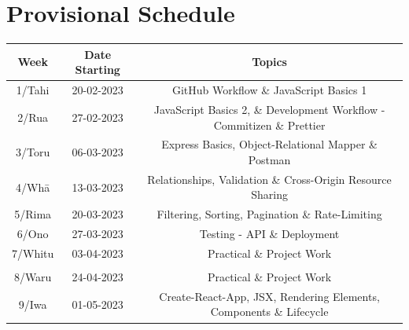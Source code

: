 \documentclass{article}
\begin{document}
\section*{Provisional Schedule}
\renewcommand{\arraystretch}{1.5}
\begin{tabular}{|c|c|c|c|}
	\hline
	\textbf{Week}                  & \textbf{Date Starting}            & \multicolumn{2}{c|}{\textbf{Topics}}                                                                                             \\ \hline
	\footnotesize 1/Tahi           & \footnotesize 20-02-2023 & \multicolumn{2}{c|}{\footnotesize GitHub Workflow \& JavaScript Basics 1}    \\ \hline
	\footnotesize 2/Rua            & \footnotesize 27-02-2023 & \multicolumn{2}{c|}{\footnotesize JavaScript Basics 2, \& Development Workflow - Commitizen \& Prettier}                   \\ \hline
	\footnotesize 3/Toru           & \footnotesize 06-03-2023 & \multicolumn{2}{c|}{\footnotesize Express Basics, Object-Relational Mapper \& Postman} \\ \hline
	\footnotesize 4/Whā            & \footnotesize 13-03-2023 & \multicolumn{2}{c|}{\footnotesize Relationships, Validation \& Cross-Origin Resource Sharing}                               \\ \hline
	\footnotesize 5/Rima           & \footnotesize 20-03-2023 & \multicolumn{2}{c|}{\footnotesize Filtering, Sorting, Pagination \& Rate-Limiting}                                                \\ \hline
	\footnotesize 6/Ono            & \footnotesize 27-03-2023  & \multicolumn{2}{c|}{\footnotesize Testing - API \& Deployment}                                                   \\ \hline
	\footnotesize 7/Whitu          & \footnotesize 03-04-2023 &  \multicolumn{2}{c|}{\footnotesize Practical \& Project Work}                            \\ \hline
	\rowcolor{yellow} \multicolumn{4}{|c|}{\footnotesize Mid Term Break}                                                                                                                         \\ \hline
	\footnotesize 8/Waru   & \footnotesize 24-04-2023 & \multicolumn{2}{c|}{\footnotesize Practical \& Project Work}                                                   \\ \hline
	\footnotesize 9/Iwa            & \footnotesize 01-05-2023 & \multicolumn{2}{c|}{\footnotesize Create-React-App, JSX, Rendering Elements, Components \& Lifecycle}                                                                 \\ \hline

\end{tabular}
\end{document}

